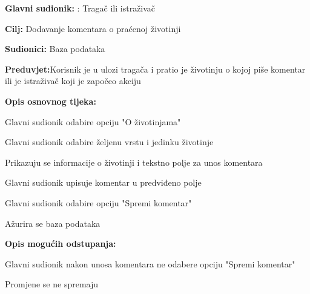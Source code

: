					\noindent {}
					\begin{packed_item}
	
						\item \textbf{Glavni sudionik: }: Tragač ili istraživač 
						\item  \textbf{Cilj:} Dodavanje komentara o praćenoj životinji
						\item  \textbf{Sudionici:} Baza podataka
						\item  \textbf{Preduvjet:}Korisnik je u ulozi tragača i pratio je životinju o kojoj piše komentar ili je istraživač koji je započeo akciju
						\item  \textbf{Opis osnovnog tijeka:}
						
						\item[] \begin{packed_enum}
	
							\item Glavni sudionik odabire opciju "O životinjama"
							\item Glavni sudionik odabire željenu vrstu i jedinku životinje
							\item Prikazuju se informacije o životinji i tekstno polje za unos komentara
							\item  Glavni sudionik upisuje komentar u predviđeno polje
							\item  Glavni sudionik odabire opciju "Spremi komentar"
							\item  Ažurira se baza podataka
							
						\end{packed_enum}
						\item  \textbf{Opis mogućih odstupanja:}
						
						\item[] \begin{packed_item}
	
							\item[5.a] Glavni sudionik nakon unosa komentara ne odabere opciju "Spremi komentar"
							
							\item[] \begin{packed_enum}
								\item Promjene se ne spremaju
							\end{packed_enum}
						\end{packed_item}
					\end{packed_item}
